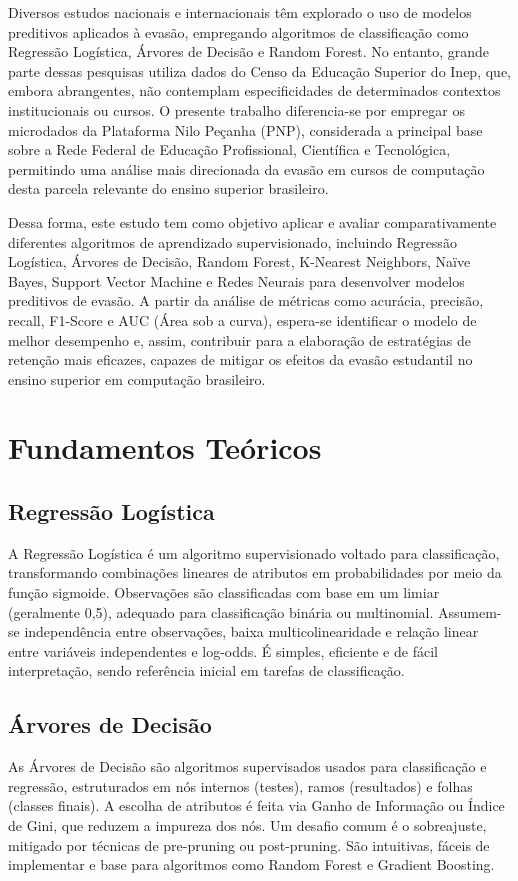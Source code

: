 \documentclass[english, spanish, brazilian]{RBIEarticle} %
\begin{document}
Diversos estudos nacionais e internacionais têm explorado o uso de modelos preditivos aplicados à evasão, empregando algoritmos de classificação como Regressão Logística, Árvores de Decisão e Random Forest. No entanto, grande parte dessas pesquisas utiliza dados do Censo da Educação Superior do Inep, que, embora abrangentes, não contemplam especificidades de determinados contextos institucionais ou cursos. O presente trabalho diferencia-se por empregar os microdados da Plataforma Nilo Peçanha (PNP), considerada a principal base sobre a Rede Federal de Educação Profissional, Científica e Tecnológica, permitindo uma análise mais direcionada da evasão em cursos de computação desta parcela relevante do ensino superior brasileiro.

Dessa forma, este estudo tem como objetivo aplicar e avaliar comparativamente diferentes algoritmos de aprendizado supervisionado, incluindo Regressão Logística, Árvores de Decisão, Random Forest, K-Nearest Neighbors, Naïve Bayes, Support Vector Machine e Redes Neurais para desenvolver modelos preditivos de evasão. A partir da análise de métricas como acurácia, precisão, recall, F1-Score e AUC (Área sob a curva), espera-se identificar o modelo de melhor desempenho e, assim, contribuir para a elaboração de estratégias de retenção mais eficazes, capazes de mitigar os efeitos da evasão estudantil no ensino superior em computação brasileiro.


\section{Fundamentos Teóricos}

\subsection{Regressão Logística}
A Regressão Logística é um algoritmo supervisionado voltado para classificação, transformando combinações lineares de atributos em probabilidades por meio da função sigmoide. Observações são classificadas com base em um limiar (geralmente 0,5), adequado para classificação binária ou multinomial. Assumem-se independência entre observações, baixa multicolinearidade e relação linear entre variáveis independentes e log-odds. É simples, eficiente e de fácil interpretação, sendo referência inicial em tarefas de classificação.

\subsection{Árvores de Decisão}
As Árvores de Decisão são algoritmos supervisados usados para classificação e regressão, estruturados em nós internos (testes), ramos (resultados) e folhas (classes finais). A escolha de atributos é feita via Ganho de Informação ou Índice de Gini, que reduzem a impureza dos nós. Um desafio comum é o sobreajuste, mitigado por técnicas de pre-pruning ou post-pruning. São intuitivas, fáceis de implementar e base para algoritmos como Random Forest e Gradient Boosting.
\end{document}
